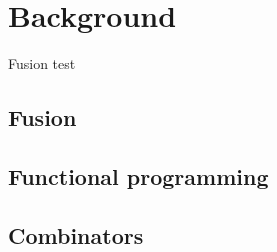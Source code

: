 \chapter{Background}
Fusion test
\section{Fusion}
\section{Functional programming}
\section{Combinators}


